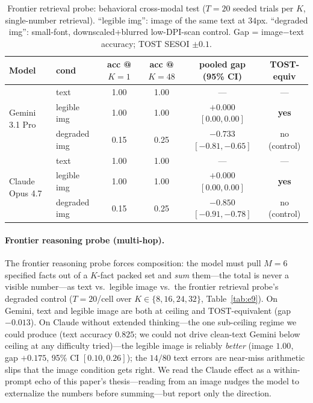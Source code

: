 \documentclass[11pt]{article}
\begin{document}
\begin{table}[h]
\small\centering
\caption{Frontier retrieval probe: behavioral cross-modal test ($T{=}20$ seeded trials per $K$, single-number retrieval). ``legible img'': image of the same text at $34$px. ``degraded img'': small-font, downscaled+blurred low-DPI-scan control. Gap = image$-$text accuracy; TOST SESOI $\pm 0.1$.}
\label{tab:e8}
\setlength{\tabcolsep}{4pt}
\begin{tabular}{llcccc}
\toprule
Model & cond & acc @ $K{=}1$ & acc @ $K{=}48$ & pooled gap (95\% CI) & TOST-equiv \\
\midrule
\multirow{3}{*}{Gemini 3.1 Pro} & text          & 1.00 & 1.00 & --- & --- \\
                                & legible img   & 1.00 & 1.00 & $+0.000$ $[0.00,0.00]$ & \textbf{yes} \\
                                & degraded img  & 0.15 & 0.25 & $-0.733$ $[-0.81,-0.65]$ & no (control) \\
\midrule
\multirow{3}{*}{Claude Opus 4.7} & text         & 1.00 & 1.00 & --- & --- \\
                                 & legible img  & 1.00 & 1.00 & $+0.000$ $[0.00,0.00]$ & \textbf{yes} \\
                                 & degraded img & 0.15 & 0.25 & $-0.850$ $[-0.91,-0.78]$ & no (control) \\
\bottomrule
\end{tabular}
\end{table}

\paragraph{Frontier reasoning probe (multi-hop).}
The frontier reasoning probe forces composition: the model must pull $M{=}6$ specified facts out of a $K$-fact packed set and \emph{sum} them---the total is never a visible number---as text vs.\ legible image vs.\ the frontier retrieval probe's degraded control ($T{=}20$/cell over $K\in\{8,16,24,32\}$, Table~\ref{tab:e9}). On Gemini, text and legible image are both at ceiling and TOST-equivalent (gap $-0.013$). On Claude without extended thinking---the one sub-ceiling regime we could produce (text accuracy $0.825$; we could not drive clean-text Gemini below ceiling at any difficulty tried)---the legible image is reliably \emph{better} (image $1.00$, gap $+0.175$, 95\% CI $[0.10,0.26]$); the $14/80$ text errors are near-miss arithmetic slips that the image condition gets right. We read the Claude effect as a within-prompt echo of this paper's thesis---reading from an image nudges the model to externalize the numbers before summing---but report only the direction.
\end{document}
